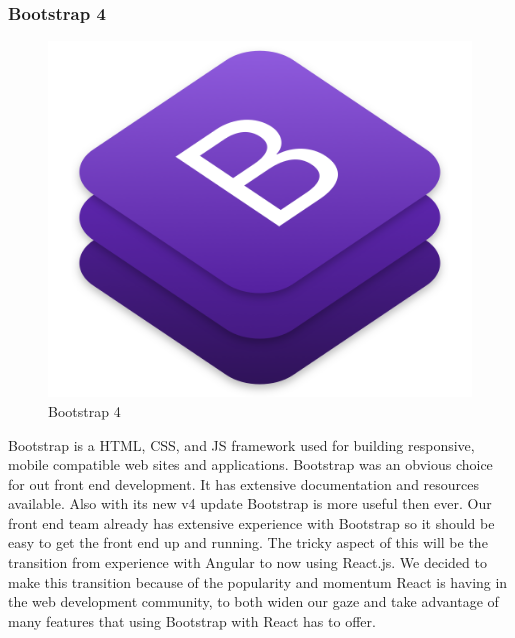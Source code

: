 \documentclass[12pt,a4paper]{report}
\begin{document}
			\subsubsection{Bootstrap 4}
			\begin{figure}
				\includegraphics[scale=0.15]{bootstrap4}
				\caption{Bootstrap 4}
				\label{fig: Bootstrap 4}
			\end{figure}
			Bootstrap is a HTML, CSS, and JS framework used for building responsive, mobile compatible web sites and applications. Bootstrap was an obvious choice for out front end development. It has extensive documentation and resources available. Also with its new v4 update Bootstrap is more useful then ever. Our front end team already has extensive experience with Bootstrap so it should be easy to get the front end up and running. The tricky aspect of this will be the transition from experience with Angular to now using React.js. We decided to make this transition because of the popularity and momentum React is having in the web development community, to both widen our gaze and take advantage of many features that using Bootstrap with React has to offer. \cite{bootstrap, ng-bootstrap}
\end{document}
